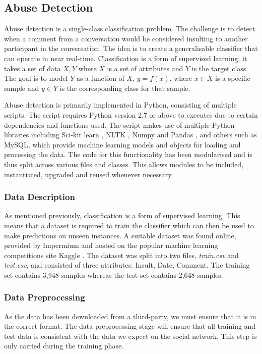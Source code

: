 \subsection{Abuse Detection}
Abuse detection is a single-class classification problem. The challenge is to detect when a comment from a conversation would be considered insulting to another participant in the conversation. The idea is to create a generalisable classifier that can operate in near real-time. Classification is a form of supervised learning; it takes a set of data ${X, Y}$ where $X$ is a set of attributes and $Y$ is the target class. The goal is to model $Y$ as a function of $X$, $y = f(x)$, where $x \in X$ is a specific sample and $y \in Y$ is the corresponding class for that sample.

Abuse detection is primarily implemented in Python, consisting of multiple scripts. The script requires Python version 2.7 or above to executes due to certain dependencies and functions used. The script makes use of multiple Python libraries including Sci-kit learn \cite{scikit:home}, NLTK \cite{nltk}, Numpy \cite{Numpy} and Pandas \cite{Pandas}, and others such as MySQL, which provide machine learning models and objects for loading and processing the data. The code for this functionality has been modularised and is thus split across various files and classes. This allows modules to be included, instantiated, upgraded and reused whenever necessary.

\subsubsection{Data Description}
As mentioned previously, classification is a form of supervised learning. This means that a dataset is required to train the classifier which can then be used to make predictions on unseen instances. A suitable dataset was found online, provided by Impermium and hosted on the popular machine learning competitions site Kaggle \cite{Kaggle:Dataset}. The dataset was split into two files, \emph{train.csv} and \emph{test.csv}, and consisted of three attributes: Insult, Date, Comment. The training set contains 3,948 samples whereas the test set contains 2,648 samples.


\subsubsection{Data Preprocessing}
As the data has been downloaded from a third-party, we must ensure that it is in the correct format. The data preprocessing stage will ensure that all training and test data is consistent with the data we expect on the social network. This step is only carried during the training phase.

